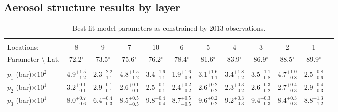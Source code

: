 \documentclass[article,11pt]{emulateapj}
\def\degx{$^\circ$}
\begin{document}
\subsection{Aerosol structure results by layer}

\begin{table*}[!htb]\centering
\caption{Best-fit model parameters as constrained by 2013 observations.}
\begin{scriptsize}
\setlength\tabcolsep{2pt}
\begin{tabular}{l c c c c c c c c c c c}
\hline\\[-0.05in]
Locations:&                   8&                   9&                   7&                  10&                   6&                   5&                   4&                   3&                   2&                   1\\[0.05in]
Parameter $\setminus$ Lat. &           72.2\degx  &          73.5\degx  &          75.6\degx  &          76.2\degx  &          78.4\degx  &          81.6\degx  &          83.9\degx  &          86.9\degx  &          88.5\degx &          89.9\degx \\[0.05in]
\hline\\[-0.05in]
 $p_1$ (bar)$\times 10^2$ &   4.9$^{+  1.5}_{-  1.2}$ &   2.3$^{+  2.2}_{-  1.1}$ &   4.8$^{+  1.5}_{-  1.2}$ &   3.4$^{+  1.6}_{-  1.1}$ &   1.9$^{+  1.6}_{-  0.9}$ &   3.1$^{+  1.6}_{-  1.1}$ &   3.4$^{+  1.8}_{-  1.2}$ &   3.5$^{+  1.1}_{-  0.8}$ &   4.7$^{+  1.0}_{-  0.8}$ &   2.5$^{+  0.8}_{-  0.6}$\\[0.05in]
 $p_2$ (bar)$\times 10^1$ &   3.2$^{+  0.1}_{-  0.1}$ &   2.9$^{+  0.1}_{-  0.1}$ &   2.6$^{+  0.1}_{-  0.1}$ &   2.5$^{+  0.1}_{-  0.1}$ &   2.4$^{+  0.2}_{-  0.2}$ &   2.6$^{+  0.2}_{-  0.2}$ &   2.3$^{+  0.3}_{-  0.2}$ &   2.6$^{+  0.3}_{-  0.2}$ &   2.7$^{+  0.4}_{-  0.3}$ &   2.9$^{+  0.4}_{-  0.3}$\\[0.05in]
 $p_3$ (bar)$\times 10^1$ &   8.0$^{+  0.7}_{-  0.6}$ &   6.4$^{+  0.4}_{-  0.3}$ &   8.5$^{+  0.5}_{-  0.5}$ &   9.8$^{+  0.4}_{-  0.4}$ &   8.7$^{+  0.5}_{-  0.5}$ &   9.6$^{+  0.2}_{-  0.2}$ &   9.2$^{+  0.3}_{-  0.3}$ &   9.4$^{+  0.3}_{-  0.3}$ &   8.4$^{+  0.3}_{-  0.3}$ &   8.8$^{+  1.3}_{-  1.2}$\\[0.05in]

\end{tabular}
\end{scriptsize}
\end{table*}
\end{document}
